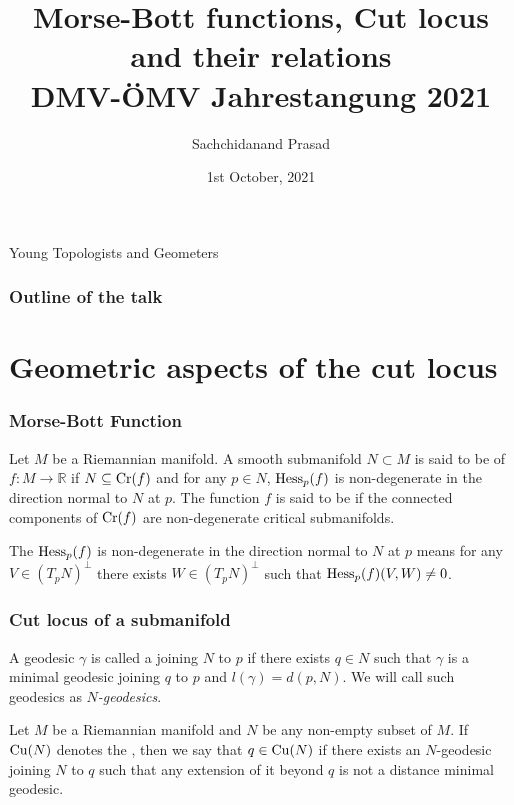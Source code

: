 \documentclass{beamer}
\title[Cut Locus]{Morse-Bott functions, Cut locus and their relations \\[1ex] \small DMV-{\"O}MV Jahrestangung 2021}
\author{Sachchidanand Prasad}
\institute[IISERK]{\small Indian Insitute of Science Education and Research Kolkata}
\date{1st October, 2021}
\begin{document}
\begin{frame}
 \titlepage
  \vspace{0.1cm}
  \begin{center}
    \Large \textcolor[rgb]{0.4,0,0.5}{Young Topologists and Geometers} \\
  \end{center}
\end{frame}

	\begin{frame}
		\frametitle<presentation>{Outline of the talk}
		\tableofcontents
	\end{frame}	

\section{Geometric aspects of the cut locus}

	\begin{frame}
		\frametitle<presentation>{Morse-Bott Function}
		
		\p\begin{definition}
			\p Let $M$ be a Riemannian manifold. A smooth submanifold $ N\subset M $ is said to be {\emph{}} of $f:M\to \mathbb{R}$ if $N\subseteq \mathrm{Cr}(f)$ \p and for any $p\in N$, $\mathrm{Hess}_{p}(f)$ is \alert<5>{non-degenerate in the direction normal to $N$ at $p$}. \p[6] The function $f$ is said to be {\emph{}} if the connected components of $ \mathrm{Cr}(f) $ are non-degenerate critical submanifolds.
		\end{definition}
		\p[5] The $\mathrm{Hess}_p(f)$ is \alert<5>{non-degenerate in the direction normal to $N$ at $p$} means for any $V\in (T_pN)^\perp$ there exists $W\in  (T_pN)^\perp$ such that $\mathrm{Hess}_p(f)(V,W)\neq 0$.
	\end{frame}	

\begin{frame}
		\frametitle<presentation>{Cut locus of a submanifold}

		\p
		\begin{definition} \label{defn:distance_minimal_geodesic}
			\p A geodesic $\gamma $ is called a \emph{} joining $N$ to $p$ \p if there exists $q\in N$ \p such that $\gamma$ is a minimal geodesic joining $q$ to $p$ \p and $l(\gamma)= d(p,N) $. \p We will call such geodesics as \textit{$N$-geodesics}.
		\end{definition}

		\p 
		\begin{definition} \label{defn:cut_locus}
			\p Let $M$ be a Riemannian manifold \p and $N$ be any non-empty subset of $M$. \p If $\mathrm{Cu}(N)$ denotes the \emph{}, \p then we say that $q\in \mathrm{Cu}(N) $ if there exists an $N$-geodesic joining $N$ to $q$ \p such that any extension of it beyond $q$ is not a distance minimal geodesic.
		\end{definition}
	\end{frame}
\end{document}
